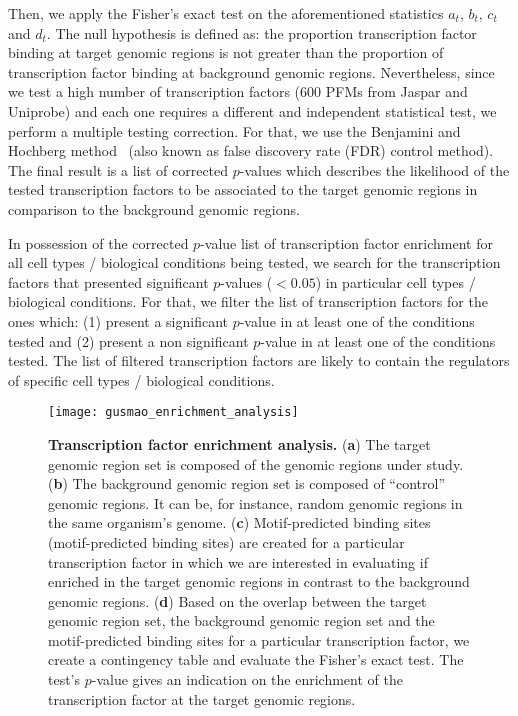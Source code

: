 Then, we apply the Fisher's exact test on the aforementioned statistics $a_t$, $b_t$, $c_t$ and $d_t$. The null hypothesis is defined as: the proportion transcription factor binding at target genomic regions is not greater than the proportion of transcription factor binding at background genomic regions. Nevertheless, since we test a high number of transcription factors (\approxy$600$ PFMs from Jaspar and Uniprobe) and each one requires a different and independent statistical test, we perform a multiple testing correction. For that, we use the Benjamini and Hochberg method~\cite{benjamini1995} (also known as false discovery rate (FDR) control method). The final result is a list of corrected $p$-values which describes the likelihood of the tested transcription factors to be associated to the target genomic regions in comparison to the background genomic regions.

In possession of the corrected $p$-value list of transcription factor enrichment for all cell types / biological conditions being tested, we search for the transcription factors that presented significant $p$-values ($< 0.05$) in particular cell types / biological conditions. For that, we filter the list of transcription factors for the ones which: (1) present a significant $p$-value in at least one of the conditions tested and (2) present a non significant $p$-value in at least one of the conditions tested. The list of filtered transcription factors are likely to contain the regulators of specific cell types / biological conditions.

\begin{figure}[h!]
\centering
\texttt{[image: gusmao\_enrichment\_analysis]}
\caption[Transcription factor enrichment analysis]{\textbf{Transcription factor enrichment analysis.} (\textbf{a}) The target genomic region set is composed of the genomic regions under study. (\textbf{b}) The background genomic region set is composed of ``control'' genomic regions. It can be, for instance, random genomic regions in the same organism's genome. (\textbf{c}) Motif-predicted binding sites (motif-predicted binding sites) are created for a particular transcription factor in which we are interested in evaluating if enriched in the target genomic regions in contrast to the background genomic regions. (\textbf{d}) Based on the overlap between the target genomic region set, the background genomic region set and the motif-predicted binding sites for a particular transcription factor, we create a contingency table and evaluate the Fisher's exact test. The test's $p$-value gives an indication on the enrichment of the transcription factor at the target genomic regions.}
\label{fig:gusmao_enrichment_analysis}
\end{figure}


